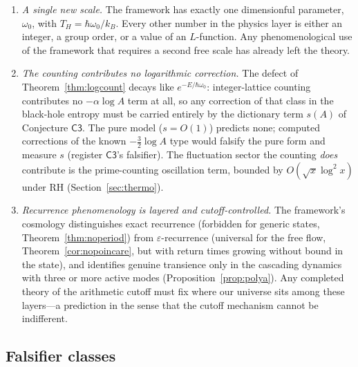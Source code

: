 \begin{enumerate}[leftmargin=1.6em]
uncertainties are two orders of magnitude coarser than the calibrated one and its values
are Standard-Model-coupled evaluations: the anomaly is recorded as flagged, not
confirmed, with the recovery power $0/100$ and a post-hoc bootstrap diagnostic ($3.5\%$)
documented alongside it. Precision, not machinery, is what the dictionary now waits on.
\item \emph{A single new scale.} The framework has exactly one dimensionful parameter,
$\omega_{0}$, with $T_{H}=\hbar\omega_{0}/k_{B}$. Every other number in the physics layer
is either an integer, a group order, or a value of an $L$-function. Any phenomenological
use of the framework that requires a second free scale has already left the theory.
\item \emph{The counting contributes no logarithmic correction.} The defect of
Theorem~\ref{thm:logcount} decays like $e^{-E/\hbar\omega_{0}}$: integer-lattice counting
contributes no $-\alpha\log A$ term at all, so any correction of that class in the
black-hole entropy must be carried entirely by the dictionary term $s(A)$ of Conjecture
$\mathsf{C3}$. The pure model ($s=O(1)$) predicts none; computed corrections of the known
$-\tfrac32\log A$ type would falsify the pure form and measure $s$
(register $\mathsf{C3}$'s falsifier). The fluctuation sector the counting \emph{does}
contribute is the prime-counting oscillation term, bounded by $O(\sqrt{x}\log^{2}x)$ under
RH (Section~\ref{sec:thermo}).
\item \emph{Recurrence phenomenology is layered and cutoff-controlled.} The framework's
cosmology distinguishes exact recurrence (forbidden for generic states,
Theorem~\ref{thm:noperiod}) from $\varepsilon$-recurrence (universal for the free flow,
Theorem~\ref{cor:nopoincare}, but with return times growing without bound in the state),
and identifies genuine transience only in the cascading dynamics with three or more active
modes (Proposition~\ref{prop:polya}). Any completed theory of the arithmetic cutoff must
fix where our universe sits among these layers---a prediction in the sense that the cutoff
mechanism cannot be indifferent.
\end{enumerate}

\subsection{Falsifier classes}\label{sec:classes}

